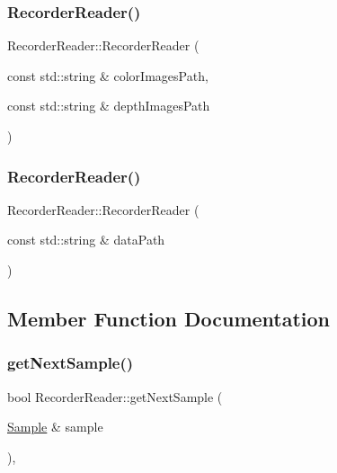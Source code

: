 \subsubsection{\texorpdfstring{Recorder\+Reader()}{RecorderReader()}\hspace{0.1cm}{\footnotesize\ttfamily [1/2]}}
{\footnotesize\ttfamily Recorder\+Reader\+::\+Recorder\+Reader (\begin{DoxyParamCaption}\item[{const std\+::string \&}]{color\+Images\+Path,  }\item[{const std\+::string \&}]{depth\+Images\+Path }\end{DoxyParamCaption})}

\mbox{\label{class_recorder_reader_a6870eb9da2db311ba366f60e602698b4}} 
\subsubsection{\texorpdfstring{Recorder\+Reader()}{RecorderReader()}\hspace{0.1cm}{\footnotesize\ttfamily [2/2]}}
{\footnotesize\ttfamily Recorder\+Reader\+::\+Recorder\+Reader (\begin{DoxyParamCaption}\item[{const std\+::string \&}]{data\+Path }\end{DoxyParamCaption})\hspace{0.3cm}{\ttfamily [explicit]}}



\subsection{Member Function Documentation}
\mbox{\label{class_recorder_reader_afc52cde597201a1838e6e31b8c801941}} 
\subsubsection{\texorpdfstring{get\+Next\+Sample()}{getNextSample()}}
{\footnotesize\ttfamily bool Recorder\+Reader\+::get\+Next\+Sample (\begin{DoxyParamCaption}\item[{\hyperlink{struct_sample}{Sample} \&}]{sample }\end{DoxyParamCaption})\hspace{0.3cm}{\ttfamily [override]}, {\ttfamily [virtual]}}



